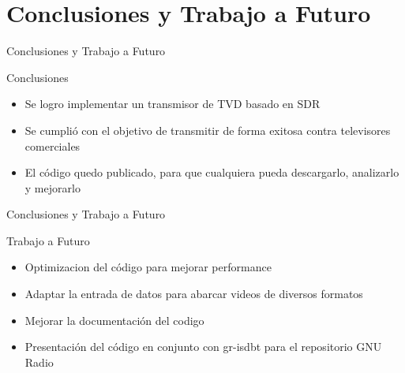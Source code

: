 \section{Conclusiones y Trabajo a Futuro}


\begin{frame}{Conclusiones y Trabajo a Futuro}
\begin{block}{Conclusiones}
	\begin{itemize}
		\item { Se logro implementar un transmisor de TVD basado en SDR }
		\item { Se cumplió con el objetivo de transmitir de forma exitosa contra televisores comerciales }
		\item { El código quedo publicado, para que cualquiera pueda descargarlo, analizarlo y mejorarlo}
	\end{itemize}
\end{block}
\end{frame}


\begin{frame}{Conclusiones y Trabajo a Futuro}
\begin{block}{Trabajo a Futuro}
	\begin{itemize}
		\item { Optimizacion del código para mejorar performance }
		\item { Adaptar la entrada de datos para abarcar videos de diversos formatos }
		\item { Mejorar la documentación del codigo}
		\item { Presentación del código en conjunto con gr-isdbt para el repositorio GNU Radio}
	\end{itemize}
\end{block}
\end{frame}